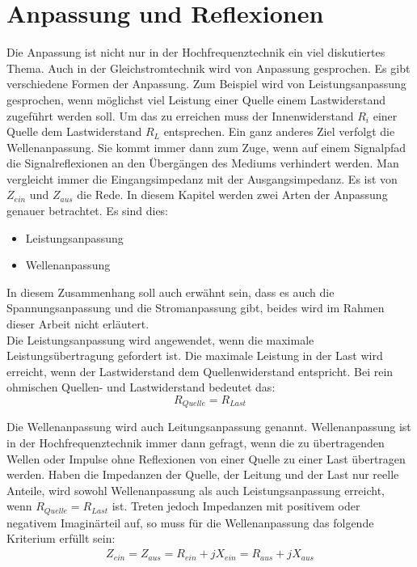 \section{Anpassung und Reflexionen}\label{sec:AnpassungReflexionen}
Die Anpassung ist nicht nur in der Hochfrequenztechnik ein viel diskutiertes Thema. Auch in der Gleichstromtechnik wird von Anpassung gesprochen. Es gibt verschiedene Formen der Anpassung. Zum Beispiel wird von Leistungsanpassung gesprochen, wenn möglichst viel Leistung einer Quelle einem Lastwiderstand zugeführt werden soll. Um das zu erreichen muss der Innenwiderstand  $R_i$ einer Quelle dem Lastwiderstand $R_L$ entsprechen.  Ein ganz anderes Ziel verfolgt die Wellenanpassung. Sie kommt immer dann zum Zuge, wenn auf einem Signalpfad die Signalreflexionen an den Übergängen des Mediums verhindert werden.
Man vergleicht immer die Eingangsimpedanz mit der Ausgangsimpedanz. Es ist  von $Z_{ein}$ und $Z_{aus}$ die Rede.
In diesem Kapitel werden zwei Arten der Anpassung genauer betrachtet. Es sind dies:
\begin{itemize}
\item Leistungsanpassung
\item Wellenanpassung
\end{itemize}
In diesem Zusammenhang soll auch erwähnt sein, dass es auch die Spannungsanpassung und die Stromanpassung gibt, beides wird im Rahmen dieser Arbeit nicht erläutert. \\
Die Leistungsanpassung wird angewendet, wenn die maximale Leistungsübertragung gefordert ist. Die maximale Leistung in der Last wird erreicht, wenn der Lastwiderstand dem Quellenwiderstand entspricht. Bei rein ohmischen Quellen- und Lastwiderstand bedeutet das:\\
\[R_{Quelle} = R_{Last}\]

Die Wellenanpassung wird auch Leitungsanpassung  genannt. Wellenanpassung ist in der Hochfrequenztechnik immer dann gefragt, wenn die zu übertragenden Wellen oder Impulse ohne Reflexionen von einer Quelle zu einer Last übertragen werden. Haben die Impedanzen der Quelle, der Leitung und der Last nur reelle Anteile, wird sowohl Wellenanpassung als auch Leistungsanpassung erreicht, wenn $R_{Quelle} = R_{Last}$ ist. Treten jedoch Impedanzen mit positivem oder negativem Imaginärteil auf, so muss für die Wellenanpassung das folgende Kriterium erfüllt sein: \\
\begin{eqnarray}\label{eq:ZeinZaus}
Z_{ein} = Z_{aus} = R_{ein} +jX_{ein} = R_{aus} + jX_{aus}
\end{eqnarray}



